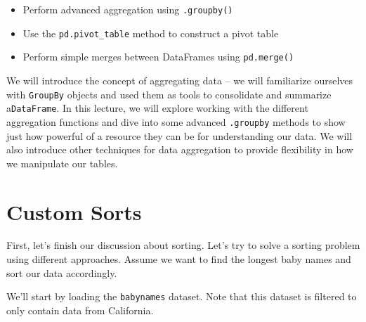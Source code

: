 \documentclass[
  letterpaper,
  DIV=11,
  numbers=noendperiod]{scrreprt}
\providecommand{\tightlist}{%
  \setlength{\itemsep}{0pt}\setlength{\parskip}{0pt}}\usepackage{longtable,booktabs,array}
\begin{document}
\begin{tcolorbox}[enhanced jigsaw, colback=white, opacityback=0, coltitle=black, title=\textcolor{quarto-callout-note-color}{\faInfo}\hspace{0.5em}{Learning Outcomes}, bottomtitle=1mm, breakable, titlerule=0mm, left=2mm, colbacktitle=quarto-callout-note-color!10!white, toptitle=1mm, arc=.35mm, bottomrule=.15mm, leftrule=.75mm, rightrule=.15mm, toprule=.15mm, opacitybacktitle=0.6, colframe=quarto-callout-note-color-frame]

\begin{itemize}
\tightlist
\item
  Perform advanced aggregation using \texttt{.groupby()}
\item
  Use the \texttt{pd.pivot\_table} method to construct a pivot table
\item
  Perform simple merges between DataFrames using \texttt{pd.merge()}
\end{itemize}

\end{tcolorbox}

We will introduce the concept of aggregating data -- we will familiarize
ourselves with \texttt{GroupBy} objects and used them as tools to
consolidate and summarize a\texttt{DataFrame}. In this lecture, we will
explore working with the different aggregation functions and dive into
some advanced \texttt{.groupby} methods to show just how powerful of a
resource they can be for understanding our data. We will also introduce
other techniques for data aggregation to provide flexibility in how we
manipulate our tables.

\hypertarget{custom-sorts}{%
\section{Custom Sorts}\label{custom-sorts}}

First, let's finish our discussion about sorting. Let's try to solve a
sorting problem using different approaches. Assume we want to find the
longest baby names and sort our data accordingly.

We'll start by loading the \texttt{babynames} dataset. Note that this
dataset is filtered to only contain data from California.
\end{document}
